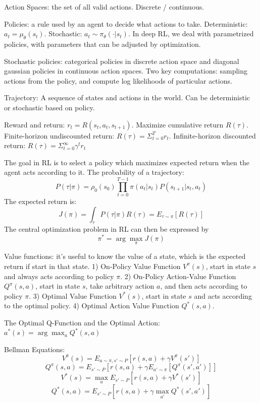 \documentclass{article}
\begin{document}
    Action Spaces: the set of all valid actions. Discrete / continuous.

    Policies: a rule used by an agent to decide what actions to take. Deterministic: $a_t = \mu_{\theta}(s_t)$. Stochastic: $a_t \sim \pi_{\theta}(\cdot | s_t)$. In deep RL, we deal with parametrized policies, with parameters that can be adjusted by optimization. 
    
    Stochastic policies: categorical policies in discrete action space and diagonal gaussian policies in continuous action spaces. Two key computations: sampling actions from the policy, and compute log likelihoods of particular actions.

    Trajectory: A sequence of states and actions in the world. Can be deterministic or stochastic based on policy. 

    Reward and return: $r_t = R(s_t, a_t, s_{t+1})$. Maximize cumulative return $R(\tau)$. Finite-horizon undiscounted return: $R(\tau) = \Sigma_{t = 0} ^T r_t$. Infinite-horizon discounted return: $R(\tau) = \Sigma_{t =0} ^{\infty}\gamma^tr_t$

    The goal in RL is to select a policy which maximizes expected return when the agent acts according to it. The probability of a trajectory: 
    $$P(\tau | \pi) = \rho_0(s_0) \prod_{t = 0} ^{T - 1} \pi(a_t | s_t) P(s_{t+1}|s_t, a_t)$$
    The expected return is:
    $$
    J(\pi) = \int_\tau P(\tau | \pi) R(\tau) = E_{\tau \sim \pi} [R(\tau)]
    $$
    The central optimization problem in RL can then be expressed by
    $$
    \pi^* = \arg\max_\pi J(\pi)
    $$

    Value functions: it's useful to know the value of a state, which is the expected return if start in that state. 1) On-Policy Value Function $V^\pi(s)$, start in state $s$ and always acts according to policy $\pi$. 2) On-Policy Action-Value Function $Q^\pi(s, a)$, start in state $s$, take arbitrary action $a$, and then acts according to policy $\pi$. 3) Optimal Value Function $V^*(s)$, start in state $s$ and acts according to the optimal policy. 4) Optimal Action Value Function $Q^*(s, a)$. 

    The Optimal Q-Function and the Optimal Action: $a^*(s) = \arg\max_a Q^*(s, a)$

    Bellman Equations: 
    $$
      V^\pi(s) = E_{a \sim \pi, s' \sim P}[r(s,a) + \gamma V^\pi(s')]
    $$
    $$
      Q^\pi(s, a) = E_{s' \sim P} [r(s, a) + \gamma E_{a' \sim \pi}[Q^\pi(s', a')]]
    $$
    $$
      V^*(s ) = \max_a E_{s' \sim P} [r(s, a) + \gamma V^*(s')]
    $$
    $$
      Q^*(s, a) = E_{s' \sim P} [r(s, a) + \gamma \max_{a'} Q^*(s', a')]
    $$
\end{document}
